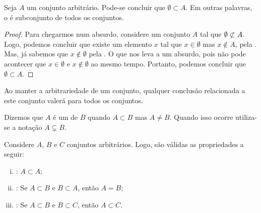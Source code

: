 \begin{proposition}
\label{prop:emptyset1}
Seja $A$ um conjunto arbitrário. Pode-se concluir que $\emptyset \subset A$.
Em outras palavras, o  é subconjunto de todos os conjuntos.
\end{proposition}

\begin{proof}
Para chegarmos num absurdo, considere um conjunto $A$ tal que $\emptyset \not\subset A$.
Logo, podemos concluir que existe um elemento $x$ tal que $x \in \emptyset$ mas $x \notin A$, pela .
Mas, já sabemos que $x \notin \emptyset$ pela .
O que nos leva a um absurdo, pois não pode acontecer que $x \in \emptyset$ e $x \notin \emptyset$ ao mesmo tempo.
Portanto, podemos concluir que $\emptyset \subset A$.
\end{proof}

\begin{remark}
Ao manter a arbitrariedade de um conjunto, qualquer conclusão relacionada a este conjunto valerá para todos os conjuntos.
\end{remark}

\begin{definition}
Dizemos que $A$ é um  de $B$ quando $A \subset B$ mas $A \neq B$.
Quando isso ocorre utiliza-se a notação $A \subsetneq B$.
\end{definition}

\begin{proposition}
Considere $A$, $B$ e $C$ conjuntos arbitrários. Logo, são válidas as propriedades a seguir:

\begin{enumerate}[i)]
\item
	\label{inclusao:reflexividade}
	: $A \subset A$;
\item
	\label{inclusao:antissimetria}
	: Se $A \subset B$ e $B \subset A$, então $A = B$;
\item
	\label{inclusao:transitividade}
	: Se $A \subset B$ e $B \subset C$, então $A \subset C$.
\end{enumerate}
\end{proposition}

